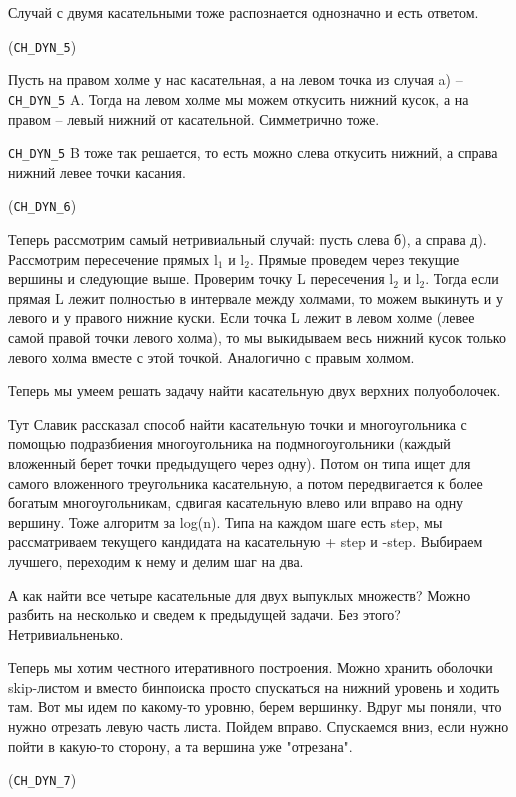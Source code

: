 \documentclass[11pt]{article}
\begin{document}
Случай с двумя касательными тоже распознается однозначно и есть
ответом.

(\texttt{CH\_DYN\_5})

Пусть на правом холме у нас касательная, а на левом точка из случая
a) -- \texttt{CH\_DYN\_5} A. Тогда на левом холме мы можем откусить нижний
кусок, а на правом -- левый нижний от касательной. Симметрично тоже.

\texttt{CH\_DYN\_5} B тоже так решается, то есть можно слева откусить нижний, а
справа нижний левее точки касания.

(\texttt{CH\_DYN\_6})

Теперь рассмотрим самый нетривиальный случай: пусть слева б), а
справа д). Рассмотрим пересечение прямых l\(_{\text{1}}\) и l\(_{\text{2}}\). Прямые проведем
через текущие вершины и следующие выше. Проверим точку L пересечения
l\(_{\text{2}}\) и l\(_{\text{2}}\). Тогда если прямая L лежит полностью в интервале между
холмами, то можем выкинуть и у левого и у правого нижние куски. Если
точка L лежит в левом холме (левее самой правой точки левого холма),
то мы выкидываем весь нижний кусок только левого холма вместе с этой
точкой. Аналогично с правым холмом.

Теперь мы умеем решать задачу найти касательную двух верхних
полуоболочек.

Тут Славик рассказал способ найти касательную точки и многоугольника
с помощью подразбиения многоугольника на подмногоугольники (каждый
вложенный берет точки предыдущего через одну). Потом он типа ищет
для самого вложенного треугольника касательную, а потом
передвигается к более богатым многоугольникам, сдвигая касательную
влево или вправо на одну вершину. Тоже алгоритм за log(n). Типа на
каждом шаге есть step, мы рассматриваем текущего кандидата на
касательную + step и -step. Выбираем лучшего, переходим к нему и
делим шаг на два.

А как найти все четыре касательные для двух выпуклых множеств?
Можно разбить на несколько и сведем к предыдущей задачи. Без этого?
Нетривиальненько.



Теперь мы хотим честного итеративного построения. Можно хранить
оболочки skip-листом и вместо бинпоиска просто спускаться на нижний
уровень и ходить там. Вот мы идем по какому-то уровню, берем
вершинку. Вдруг мы поняли, что нужно отрезать левую часть
листа. Пойдем вправо. Спускаемся вниз, если нужно пойти в какую-то
сторону, а та вершина уже "отрезана".

(\texttt{CH\_DYN\_7})
\end{document}

